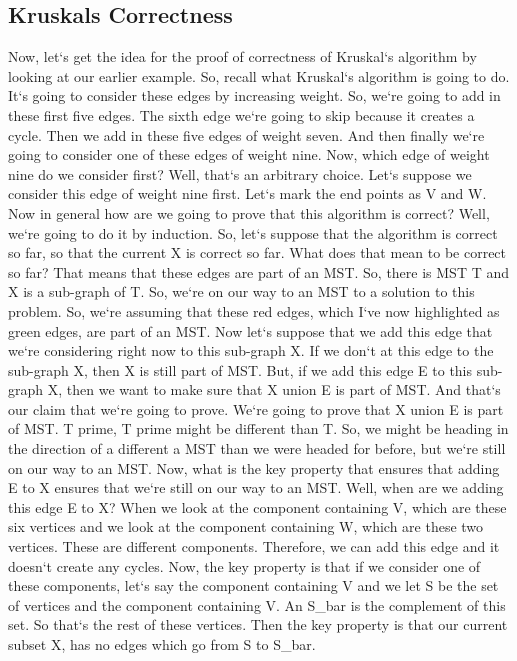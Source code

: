 \subsection{Kruskals  Correctness}
Now, let`s get the idea for the proof of correctness of Kruskal`s algorithm by looking at our earlier example.
So, recall what Kruskal`s algorithm is going to do.
It`s going to consider these edges by increasing weight.
So, we`re going to add in these first five edges.
The sixth edge we`re going to skip because it creates a cycle.
Then we add in these five edges of weight seven.
And then finally we`re going to consider one of these edges of weight nine.
Now, which edge of weight nine do we consider first? Well, that`s an arbitrary choice.
Let`s suppose we consider this edge of weight nine first.
Let`s mark the end points as V and W\@.
Now in general how are we going to prove that this algorithm is correct? Well, we`re going to do it by induction.
So, let`s suppose that the algorithm is correct so far, so that the current X is correct so far.
What does that mean to be correct so far? That means that these edges are part of an MST\@.
So, there is MST T and X is a sub-graph of T\@.
So, we`re on our way to an MST to a solution to this problem.
So, we`re assuming that these red edges, which I`ve now highlighted as green edges, are part of an MST\@.
Now let`s suppose that we add this edge that we`re considering right now to this sub-graph X\@.
If we don`t at this edge to the sub-graph X, then X is still part of MST\@.
But, if we add this edge E to this sub-graph X, then we want to make sure that X union E is part of MST\@.
And that`s our claim that we`re going to prove.
We`re going to prove that X union E is part of MST\@.
T prime, T prime might be different than T\@.
So, we might be heading in the direction of a different a MST than we were headed for before, but we`re still on our way to an MST\@.
Now, what is the key property that ensures that adding E to X ensures that we`re still on our way to an MST\@.
Well, when are we adding this edge E to X? When we look at the component containing V, which are these six vertices and we look at the component containing W, which are these two vertices.
These are different components.
Therefore, we can add this edge and it doesn`t create any cycles.
Now, the key property is that if we consider one of these components, let`s say the component containing V and we let S be the set of vertices and the component containing V\@.
An S\_bar is the complement of this set.
So that`s the rest of these vertices.
Then the key property is that our current subset X, has no edges which go from S to S\_bar.
